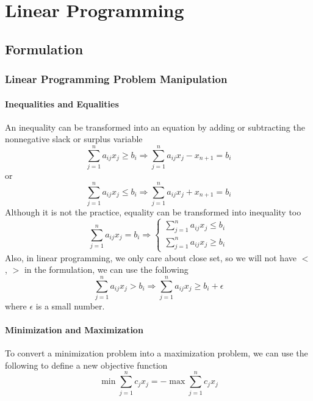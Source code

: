 \part{Linear Programming}
	\chapter{Formulation}
		\section{Linear Programming Problem Manipulation}
			\subsection{Inequalities and Equalities}
				An inequality can be transformed into an equation by adding or subtracting the nonnegative slack or surplus variable
				\begin{equation}
					\sum_{j=1}^na_{ij}x_j \ge b_i \Rightarrow \sum_{j=1}^na_{ij}x_j - x_{n+1} = b_i 
				\end{equation}
				or
				\begin{equation}
					\sum_{j=1}^na_{ij}x_j \le b_i \Rightarrow \sum_{j=1}^na_{ij}x_j + x_{n+1} = b_i 
				\end{equation}
				Although it is not the practice, equality can be transformed into inequality too
				\begin{equation}
					\sum_{j=1}^na_{ij}x_j = b_i \Rightarrow \begin{cases}\sum_{j=1}^na_{ij}x_j \le b_i \\ \sum_{j=1}^na_{ij}x_j \ge b_i \end{cases} 
				\end{equation}
				Also, in linear programming, we only care about close set, so we will not have $<$, $>$ in the formulation, we can use the following
				\begin{equation}
					\sum_{j=1}^na_{ij}x_j > b_i \Rightarrow \sum_{j=1}^na_{ij}x_j \ge b_i + \epsilon 
				\end{equation}
				where $\epsilon$ is a small number.
			\subsection{Minimization and Maximization}
				To convert a minimization problem into a maximization problem, we can use the following to define a new objective function
				\begin{equation}
					\min \sum_{j=1}^nc_jx_j = -\max \sum_{j=1}^n c_jx_j 
				\end{equation}
